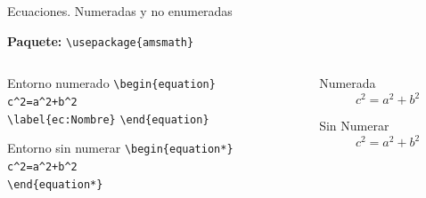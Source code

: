 \documentclass[aspectratio=169, 10pt]{beamer}
\begin{document}
\begin{frame}[fragile]{Ecuaciones. Numeradas y no enumeradas}

\textbf{Paquete:} \verb|\usepackage{amsmath}|
\vspace{0.3cm}

\begin{columns}
    \begin{column}{0.4\linewidth}
    \begin{block}{Entorno numerado}
        \verb|\begin{equation}|\\
        \hspace{1cm} \verb|c^2=a^2+b^2|\\
        \verb|\label{ec:Nombre}|
        \verb|\end{equation}|\\
    \end{block}
    \begin{block}{Entorno sin numerar}
        \verb|\begin{equation*}|\\
        \hspace{1cm} \verb|c^2=a^2+b^2|\\
        \verb|\end{equation*}|
    \end{block}
    \end{column}
    \begin{column}{0.4\linewidth}
    \begin{exampleblock}{Numerada}
        \begin{equation}
            c^2=a^2+b^2
            \label{ec:Pitagoras}
        \end{equation}
    \end{exampleblock}
    \vspace{1cm}
    \begin{exampleblock}{Sin Numerar}
        \begin{equation*}
            c^2=a^2+b^2
            \label{ec:Pitagoras}
        \end{equation*}
    \end{exampleblock}
    \end{column}
\end{columns}
    
\end{frame}
\end{document}
